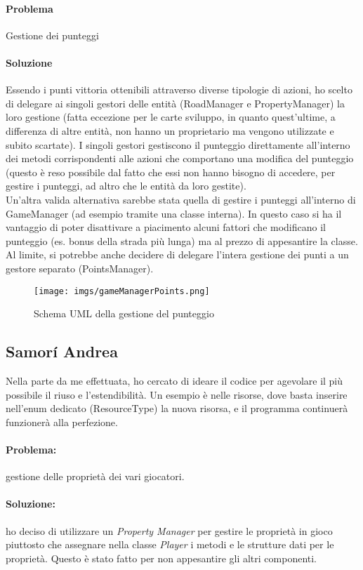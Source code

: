 \documentclass[a4paper,12pt]{report}
\begin{document}
\paragraph{Problema} Gestione dei punteggi
\paragraph{Soluzione} Essendo i punti vittoria ottenibili attraverso diverse tipologie di azioni, ho scelto di delegare ai singoli gestori delle entità (RoadManager e PropertyManager) la loro gestione (fatta eccezione per le carte sviluppo, in quanto quest'ultime, a differenza di altre entità, non hanno un proprietario ma vengono utilizzate e subito scartate). I singoli gestori gestiscono il punteggio direttamente all'interno dei metodi corrispondenti alle azioni che comportano una modifica del punteggio (questo è reso possibile dal fatto che essi non hanno bisogno di accedere, per gestire i punteggi, ad altro che le entità da loro gestite).\\
Un'altra valida alternativa sarebbe stata quella di gestire i punteggi all'interno di GameManager (ad esempio tramite una classe interna). In questo caso si ha il vantaggio di poter disattivare a piacimento alcuni fattori che modificano il punteggio (es. bonus della strada più lunga) ma al prezzo di appesantire la classe. Al limite, si potrebbe anche decidere di delegare l'intera gestione dei punti a un gestore separato (PointsManager).
\begin{figure}[H]
\centering{}
\texttt{[image: imgs/gameManagerPoints.png]}
\caption{Schema UML della gestione del punteggio}
\label{img:analysis}
\end{figure}
\subsection{Samor\'i Andrea}
Nella parte da me effettuata, ho cercato di ideare il codice per agevolare il pi\`u possibile il riuso e l'estendibilit\`a. Un esempio \`e nelle risorse, dove basta inserire nell'enum dedicato (ResourceType) la nuova risorsa, e il programma continuer\`a funzioner\`a alla perfezione.
\paragraph{Problema:}  gestione delle propriet\`a dei vari giocatori.
\paragraph{Soluzione:} ho deciso di utilizzare un \textit{Property Manager} per gestire le propriet\`a in gioco piuttosto che assegnare nella classe \textit{Player} i metodi e le strutture dati per le propriet\`a. Questo \`e stato fatto per non appesantire gli altri componenti.
\end{document}
